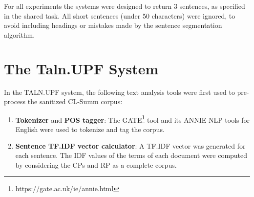 \documentclass[11pt]{article}
\begin{document}
For all experiments the systems were designed to return 3 sentences, as specified 
in the shared task. All short sentences (under 50 characters) were ignored, to 
avoid including headings or mistakes made by the sentence segmentation algorithm.


\section{The Taln.UPF System}

In the TALN.UPF system, the following text analysis tools were first used to pre-process the sanitized CL-Summ corpus:
\begin{enumerate}
\item \textbf{Tokenizer} and \textbf{POS tagger}: The GATE\footnote{https://gate.ac.uk/ie/annie.html} tool and its 
ANNIE NLP tools for English were used to tokenize and tag the corpus.
\vspace{-.3cm}
\item \textbf{Sentence TF.IDF vector calculator}: A TF.IDF vector was generated for each sentence. The IDF values of the terms of each document were computed by considering the CPs and RP as a complete corpus.
\vspace{-.3cm}
\end{enumerate}
\end{document}
